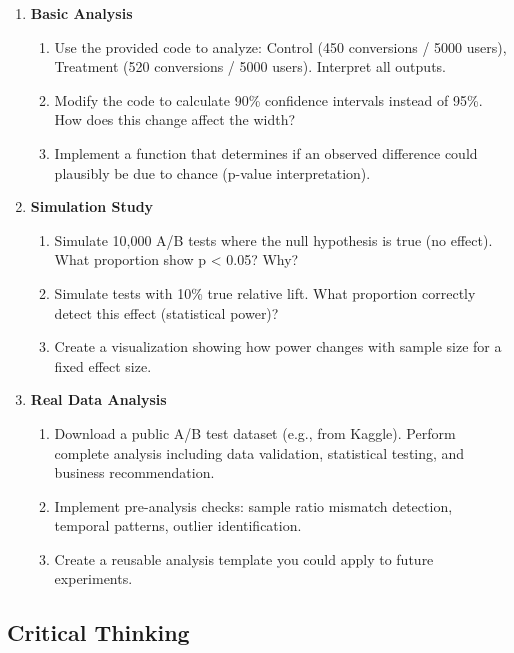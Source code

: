 \begin{enumerate}
    \item \textbf{Basic Analysis}
    \begin{enumerate}
        \item Use the provided code to analyze: Control (450 conversions / 5000 users), Treatment (520 conversions / 5000 users). Interpret all outputs.
        \item Modify the code to calculate 90\% confidence intervals instead of 95\%. How does this change affect the width?
        \item Implement a function that determines if an observed difference could plausibly be due to chance (p-value interpretation).
    \end{enumerate}

    \item \textbf{Simulation Study}
    \begin{enumerate}
        \item Simulate 10,000 A/B tests where the null hypothesis is true (no effect). What proportion show p < 0.05? Why?
        \item Simulate tests with 10\% true relative lift. What proportion correctly detect this effect (statistical power)?
        \item Create a visualization showing how power changes with sample size for a fixed effect size.
    \end{enumerate}

    \item \textbf{Real Data Analysis}
    \begin{enumerate}
        \item Download a public A/B test dataset (e.g., from Kaggle). Perform complete analysis including data validation, statistical testing, and business recommendation.
        \item Implement pre-analysis checks: sample ratio mismatch detection, temporal patterns, outlier identification.
        \item Create a reusable analysis template you could apply to future experiments.
    \end{enumerate}
\end{enumerate}

\subsection{Critical Thinking}

